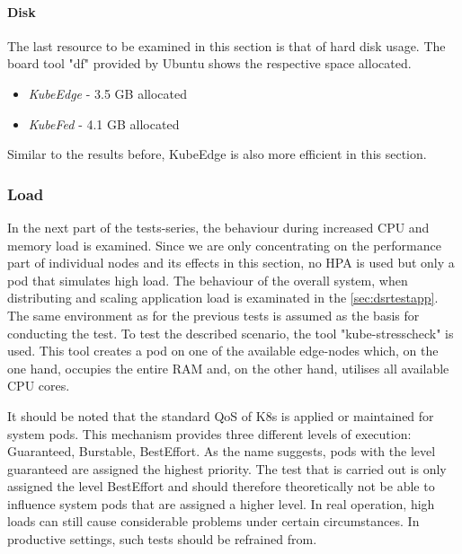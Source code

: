 \documentclass[MSC,Master,english]{twbook}%
\begin{document}
\paragraph{Disk} The last resource to be examined in this section is that of hard disk usage. The board tool "df" provided by Ubuntu shows the respective space allocated.

\begin{itemize}
    \itemsep0em 
    \item \textit{KubeEdge} - 3.5 GB allocated
    \item \textit{KubeFed} - 4.1 GB allocated
\end{itemize}
Similar to the results before, KubeEdge is also more efficient in this section.

\subsubsection{Load} In the next part of the tests-series, the behaviour during increased CPU and memory load is examined. Since we are only concentrating on the performance part of individual nodes and its effects in this section, no \ac{HPA} is used but only a pod that simulates high load. The behaviour of the overall system, when distributing and scaling application load is examinated in the \autoref{sec:dsrtestapp}. The same environment as for the previous tests is assumed as the basis for conducting the test. To test the described scenario, the tool "kube-stresscheck"\cite{kube-stress} is used. This tool creates a pod on one of the available edge-nodes which, on the one hand, occupies the entire \ac{RAM} and, on the other hand, utilises all available CPU cores.

It should be noted that the standard \ac{QoS} of \ac{K8s} is applied or maintained for system pods\cite{k8s-qos}. This mechanism provides three different levels of execution: Guaranteed, Burstable, BestEffort. As the name suggests, pods with the level guaranteed are assigned the highest priority. The test that is carried out is only assigned the level BestEffort and should therefore theoretically not be able to influence system pods that are assigned a higher level. In real operation, high loads can still cause considerable problems under certain circumstances. In productive settings, such tests should be refrained from.
\end{document}
